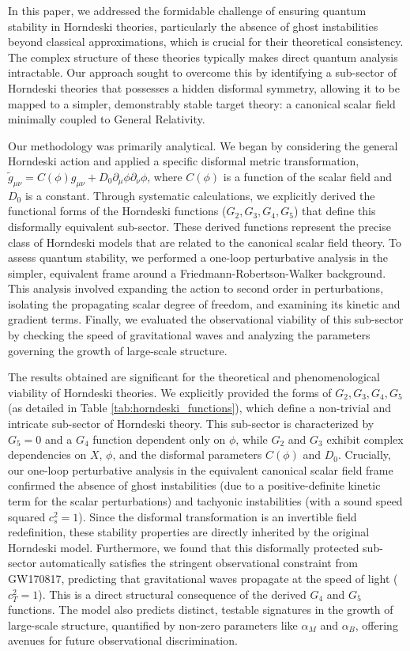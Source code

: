 \documentclass[twocolumn]{aastex631}
\begin{document}
In this paper, we addressed the formidable challenge of ensuring quantum stability in Horndeski theories, particularly the absence of ghost instabilities beyond classical approximations, which is crucial for their theoretical consistency. The complex structure of these theories typically makes direct quantum analysis intractable. Our approach sought to overcome this by identifying a sub-sector of Horndeski theories that possesses a hidden disformal symmetry, allowing it to be mapped to a simpler, demonstrably stable target theory: a canonical scalar field minimally coupled to General Relativity.

Our methodology was primarily analytical. We began by considering the general Horndeski action and applied a specific disformal metric transformation, $\tilde{g}_{\mu\nu} = C(\phi) g_{\mu\nu} + D_0 \partial_\mu\phi \partial_\nu\phi$, where $C(\phi)$ is a function of the scalar field and $D_0$ is a constant. Through systematic calculations, we explicitly derived the functional forms of the Horndeski functions ($G_2, G_3, G_4, G_5$) that define this disformally equivalent sub-sector. These derived functions represent the precise class of Horndeski models that are related to the canonical scalar field theory. To assess quantum stability, we performed a one-loop perturbative analysis in the simpler, equivalent frame around a Friedmann-Robertson-Walker background. This analysis involved expanding the action to second order in perturbations, isolating the propagating scalar degree of freedom, and examining its kinetic and gradient terms. Finally, we evaluated the observational viability of this sub-sector by checking the speed of gravitational waves and analyzing the parameters governing the growth of large-scale structure.

The results obtained are significant for the theoretical and phenomenological viability of Horndeski theories. We explicitly provided the forms of $G_2, G_3, G_4, G_5$ (as detailed in Table \ref{tab:horndeski_functions}), which define a non-trivial and intricate sub-sector of Horndeski theory. This sub-sector is characterized by $G_5=0$ and a $G_4$ function dependent only on $\phi$, while $G_2$ and $G_3$ exhibit complex dependencies on $X$, $\phi$, and the disformal parameters $C(\phi)$ and $D_0$. Crucially, our one-loop perturbative analysis in the equivalent canonical scalar field frame confirmed the absence of ghost instabilities (due to a positive-definite kinetic term for the scalar perturbations) and tachyonic instabilities (with a sound speed squared $c_s^2=1$). Since the disformal transformation is an invertible field redefinition, these stability properties are directly inherited by the original Horndeski model. Furthermore, we found that this disformally protected sub-sector automatically satisfies the stringent observational constraint from GW170817, predicting that gravitational waves propagate at the speed of light ($c_T^2=1$). This is a direct structural consequence of the derived $G_4$ and $G_5$ functions. The model also predicts distinct, testable signatures in the growth of large-scale structure, quantified by non-zero parameters like $\alpha_M$ and $\alpha_B$, offering avenues for future observational discrimination.
\end{document}
